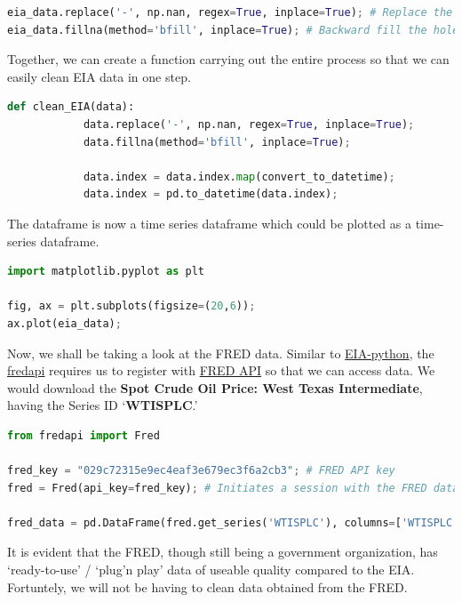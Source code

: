 \begin{lstlisting}[language=Python]
eia_data.replace('-', np.nan, regex=True, inplace=True); # Replace the '-' with np.nan
eia_data.fillna(method='bfill', inplace=True); # Backward fill the holes, by filling them with the data infront.
\end{lstlisting}

Together, we can create a function carrying out the entire process so
that we can easily clean EIA data in one step.

\begin{lstlisting}[language=Python]
def clean_EIA(data):
            data.replace('-', np.nan, regex=True, inplace=True);
            data.fillna(method='bfill', inplace=True);
            
            data.index = data.index.map(convert_to_datetime);
            data.index = pd.to_datetime(data.index);
\end{lstlisting}

The dataframe is now a time series dataframe which could be plotted as a
time-series dataframe.

\begin{lstlisting}[language=Python]
import matplotlib.pyplot as plt

fig, ax = plt.subplots(figsize=(20,6));
ax.plot(eia_data);
\end{lstlisting}

Now, we shall be taking a look at the FRED data. Similar to
\href{https://github.com/mra1385/EIA-python/}{EIA-python}, the
\href{https://github.com/mortada/fredapi}{fredapi} requires us to
register with \href{https://research.stlouisfed.org/docs/api/fred/}{FRED
API} so that we can access data. We would download the \textbf{Spot
Crude Oil Price: West Texas Intermediate}, having the Series ID
`\textbf{WTISPLC}.'

\begin{lstlisting}[language=Python]
from fredapi import Fred

fred_key = "029c72315e9ec4eaf3e679ec3f6a2cb3"; # FRED API key
fred = Fred(api_key=fred_key); # Initiates a session with the FRED datacenter to recieve datasets

fred_data = pd.DataFrame(fred.get_series('WTISPLC'), columns=['WTISPLC']); # Retrieve data from FRED API
\end{lstlisting}

It is evident that the FRED, though still being a government
organization, has `ready-to-use' / `plug'n play' data of useable quality
compared to the EIA. Fortuntely, we will not be having to clean data
obtained from the FRED.

